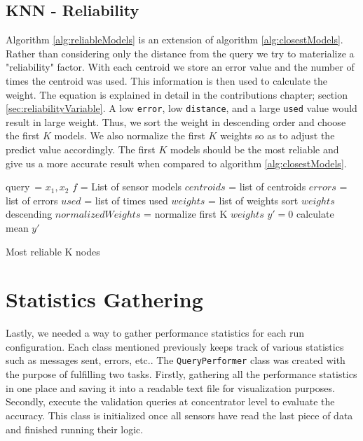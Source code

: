 \documentclass{mproj}
\begin{document}
\subsection{KNN - Reliability}
Algorithm \ref{alg:reliableModels} is an extension of algorithm \ref{alg:closestModels}. Rather than considering only the distance from the query we try to materialize a "reliability" factor. With each centroid we store an error value and the number of times the centroid was used. This information is then used to calculate the weight. The equation is explained in detail in the contributions chapter; section \ref{sec:reliabilityVariable}. A low \texttt{error}, low \texttt{distance}, and a large \texttt{used} value would  result in large weight. Thus, we sort the weight in descending order and choose the first $K$ models. We also normalize the first $K$ weights so as to adjust the predict value accordingly. The first $K$ models should be the most reliable and give us a more accurate result when compared to algorithm \ref{alg:closestModels}.

\begin{algorithm}[H]
 query\ = $x_1,x_2$\;
 $f$ = List of sensor models\;
 $centroids$ = list of centroids\;
 $errors$ = list of errors\;
 $used$ = list of times used\;
 $weights$ = list of weights\;
 sort $weights$ descending\;
 $normalizedWeights$ = normalize first K $weights$\;
 $y'=0$\;
 calculate mean $y'$\;
 \caption{Most reliable K nodes}
 \label{alg:reliableModels}
\end{algorithm}

\section{Statistics Gathering}
Lastly, we needed a way to gather performance statistics for each run configuration. Each class mentioned previously keeps track of various statistics such as messages sent, errors, etc.. The \texttt{QueryPerformer} class was created with the purpose of fulfilling two tasks. Firstly, gathering all the performance statistics in one place and saving it into a readable text file for visualization purposes. Secondly, execute the validation queries at concentrator level to evaluate the accuracy. This class is initialized once all sensors have read the last piece of data and finished running their logic.
\end{document}
